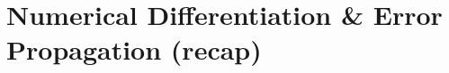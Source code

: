 \documentclass[structabstract]{aa}
\begin{document}
\section{Numerical Differentiation \& Error Propagation (recap)}
\label{sect:num_diff_errors}

\begin{figure}[!t]
\centering
{}

\end{figure}
\end{document}
